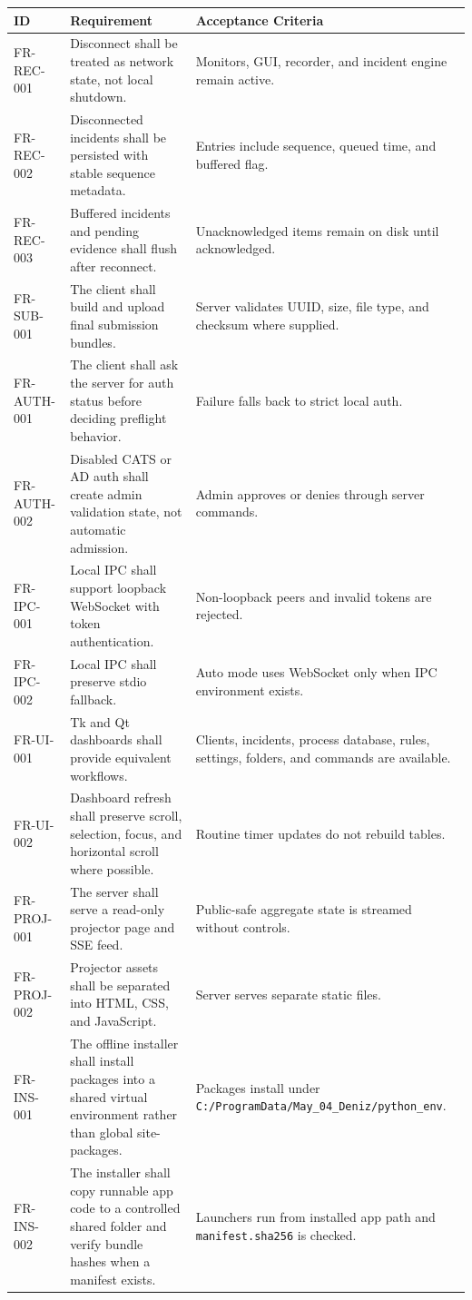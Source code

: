\documentclass[12pt,a4paper]{article}
\begin{document}
\begin{longtable}{L{0.15\textwidth} L{0.47\textwidth} L{0.28\textwidth}}
\textbf{ID} & \textbf{Requirement} & \textbf{Acceptance Criteria} \\
\hline
FR-REC-001 & Disconnect shall be treated as network state, not local shutdown. & Monitors, GUI, recorder, and incident engine remain active. \\
FR-REC-002 & Disconnected incidents shall be persisted with stable sequence metadata. & Entries include sequence, queued time, and buffered flag. \\
FR-REC-003 & Buffered incidents and pending evidence shall flush after reconnect. & Unacknowledged items remain on disk until acknowledged. \\
FR-SUB-001 & The client shall build and upload final submission bundles. & Server validates UUID, size, file type, and checksum where supplied. \\
FR-AUTH-001 & The client shall ask the server for auth status before deciding preflight behavior. & Failure falls back to strict local auth. \\
FR-AUTH-002 & Disabled CATS or AD auth shall create admin validation state, not automatic admission. & Admin approves or denies through server commands. \\
FR-IPC-001 & Local IPC shall support loopback WebSocket with token authentication. & Non-loopback peers and invalid tokens are rejected. \\
FR-IPC-002 & Local IPC shall preserve stdio fallback. & Auto mode uses WebSocket only when IPC environment exists. \\
FR-UI-001 & Tk and Qt dashboards shall provide equivalent workflows. & Clients, incidents, process database, rules, settings, folders, and commands are available. \\
FR-UI-002 & Dashboard refresh shall preserve scroll, selection, focus, and horizontal scroll where possible. & Routine timer updates do not rebuild tables. \\
FR-PROJ-001 & The server shall serve a read-only projector page and SSE feed. & Public-safe aggregate state is streamed without controls. \\
FR-PROJ-002 & Projector assets shall be separated into HTML, CSS, and JavaScript. & Server serves separate static files. \\
FR-INS-001 & The offline installer shall install packages into a shared virtual environment rather than global site-packages. & Packages install under \texttt{C:/ProgramData/May\_04\_Deniz/python\_env}. \\
FR-INS-002 & The installer shall copy runnable app code to a controlled shared folder and verify bundle hashes when a manifest exists. & Launchers run from installed app path and \texttt{manifest.sha256} is checked. \\
\end{longtable}
\end{document}
